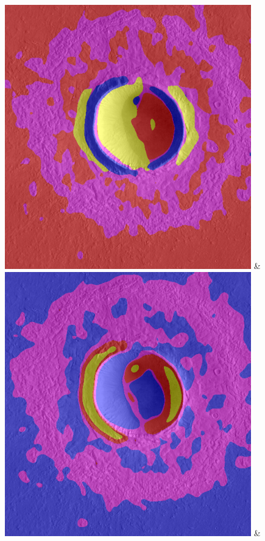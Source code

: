 \begin{table}[h!]
\begin{tabularx}{\textwidth}
		\includegraphics[width=.9\linewidth]{images/gen/filterbanks/Gre13_01.jpg_LM.png} &
		\includegraphics[width=.9\linewidth]{images/gen/filterbanks/Gre13_01.jpg_S.png} &

\end{tabularx}
\end{table}
